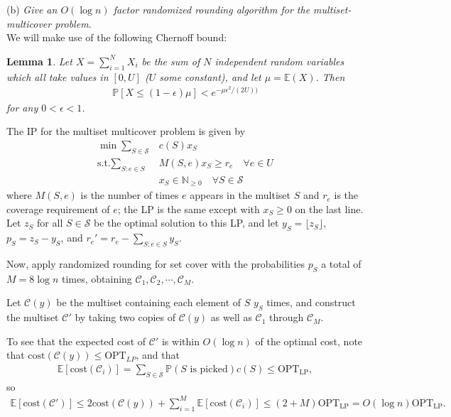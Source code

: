 \documentclass[a4paper,11pt]{article}
\newtheorem{lemma}[theorem]{Lemma}
\begin{document}
\noindent(b) \emph{Give an $O(\log n )$ factor randomized rounding algorithm for the multiset-multicover problem.} \\
We will make use of the following Chernoff bound:
\begin{lemma}
    Let $X = \sum_{i = 1}^N X_i$ be the sum of $N$ independent random variables which all take values in $[0, U]$ ($U$ some constant), and let $\mu = \mathbb{E}(X)$. Then
    \begin{align*}
        \mathbb{P}[X \leq (1 - \epsilon)\mu] < e^{-\mu \epsilon^2 / (2U))}
    \end{align*}
    for any $0 < \epsilon < 1$.
\end{lemma}
The IP for the multiset multicover problem is given by
\begin{align*}
    \min \sum_{S \in \mathcal{S}} &c(S) x_S \\
    \text{s.t.} \sum_{S : e \in S} &M(S, e) x_S \geq r_e \quad \forall e \in U \\
    &x_S \in \mathbb{N}_{\geq 0} \quad \forall S \in \mathcal{S}
\end{align*}
where $M(S, e)$ is the number of times $e$ appears in the multiset $S$ and $r_e$ is the coverage requirement of $e$; the LP is the same except with $x_S \geq 0$ on the last line. Let $z_S$ for all $S \in \mathcal{S}$ be the optimal solution to this LP, and let $y_S = \lfloor z_S \rfloor$, $p_S = z_S - y_S$, and $r_e' = r_e - \sum_{S : e \in S} y_S$. \par
Now, apply randomized rounding for set cover with the probabilities $p_S$ a total of $M = 8\log n$ times, obtaining $\mathcal{C}_1, \mathcal{C}_2, \cdots, \mathcal{C}_M$. \par
Let $\mathcal{C}(y)$ be the multiset containing each element of $S$ $y_S$ times, and construct the multiset $\mathcal{C}'$ by taking two copies of $\mathcal{C}(y)$ as well as $\mathcal{C}_1$ through $\mathcal{C}_M$. \par
To see that the expected cost of $\mathcal{C}'$ is within $O(\log n)$ of the optimal cost, note that $\text{cost}(\mathcal{C}(y)) \leq \text{OPT}_{LP}$, and that
\begin{align*}
    \mathbb{E}[\text{cost}(\mathcal{C}_i)] = \sum_{S \in \mathcal{S}} \mathbb{P}(S \text{ is picked}) c(S) \leq \text{OPT}_{\text{LP}},
\end{align*}
so
\begin{align*}
    \mathbb{E}[\text{cost}(\mathcal{C}')] \leq 2\text{cost}(\mathcal{C}(y)) + \sum_{i = 1}^M \mathbb{E}[\text{cost}(\mathcal{C}_i)] \leq (2 + M)\text{OPT}_{\text{LP}} = O(\log n) \text{OPT}_{\text{LP}}.
\end{align*}
\end{document}
